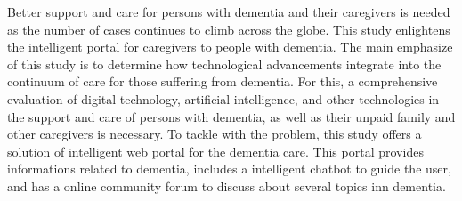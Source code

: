 

Better support and care for persons with dementia and their caregivers is needed as the number of cases continues to climb across the globe. This study enlightens the intelligent portal for caregivers to people with dementia. The main emphasize of this study is to determine how technological advancements integrate into the continuum of care for those suffering from dementia. For this, a comprehensive evaluation of digital technology, artificial intelligence, and other technologies in the support and care of persons with dementia, as well as their unpaid family and other caregivers is necessary. To tackle with the problem, this study offers a solution of intelligent web portal for the dementia care. This portal provides informations related to dementia, includes a intelligent chatbot to guide the user, and has a online community forum to discuss about several topics inn dementia.



